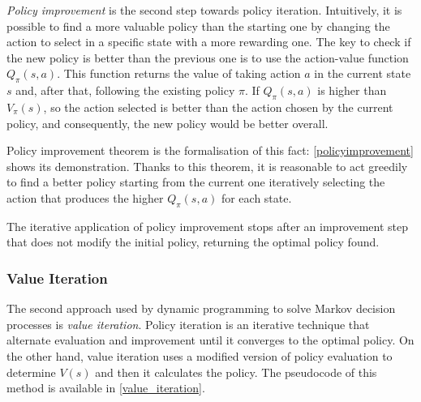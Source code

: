 \textit{Policy improvement} is the second step towards policy iteration. Intuitively, it is possible to find a more valuable policy than the starting one by changing the action to select in a specific state with a more rewarding one.  The key to check if the new policy is better than the previous one is to use the action-value function $Q_\pi(s,a)$. This function returns the value of taking action $a$ in the current state $s$ and, after that, following the existing policy $\pi$. If $Q_\pi(s,a)$ is higher than $V_\pi(s)$, so the action selected is better than the action chosen by the current policy, and consequently, the new policy would be better overall.

Policy improvement theorem is the formalisation of this fact: \vref{policyimprovement} shows its demonstration. Thanks to this theorem, it is reasonable to act greedily to find a better policy starting from the current one iteratively selecting the action that produces the higher  $Q_\pi(s, a)$ for each state.


The iterative application of policy improvement stops after an improvement step that does not modify the initial policy, returning the optimal policy found.

\subsubsection{Value Iteration}

The second approach used by dynamic programming to solve Markov decision processes is \textit{value iteration}.
Policy iteration is an iterative technique that alternate evaluation and improvement until it converges to the optimal policy.
On the other hand, value iteration uses a modified version of policy evaluation to determine $V(s)$ and then it calculates the policy.
The pseudocode of this method is available in \vref{value_iteration}.

